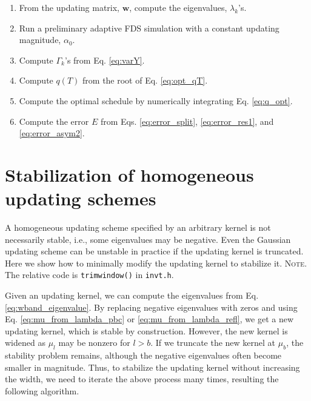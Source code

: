 \documentclass[reprint, floatfix]{revtex4-1}
\newcommand{\note}[1]{{\color{DarkGreen}\footnotesize \textsc{Note.} #1}}
\begin{document}
\begin{enumerate}

\item
From the updating matrix, $\mathbf w$,
compute the eigenvalues, $\lambda_k$'s.

\item
Run a preliminary adaptive FDS simulation
with a constant updating magnitude, $\alpha_0$.

\item
Compute $\Gamma_k$'s from Eq. \eqref{eq:varY}.

\item
Compute $q(T)$ from the root of Eq. \eqref{eq:opt_qT}.

\item
Compute the optimal schedule by
numerically integrating Eq. \eqref{eq:q_opt}.

\item
Compute the error $E$ from
Eqs. \eqref{eq:error_split},
  \eqref{eq:error_res1},
  and
  \eqref{eq:error_asym2}.

\end{enumerate}







\section{\label{sec:stabilize_wband}
Stabilization of homogeneous updating schemes}



%
A homogeneous updating scheme
specified by an arbitrary kernel
is not necessarily stable,
i.e., some eigenvalues may be negative.
%
%
  Even
  the Gaussian updating scheme can be unstable
  in practice
  if the updating kernel is truncated.
%
Here we show how to minimally modify
the updating kernel
to stabilize it.
%
\note{The relative code is \texttt{trimwindow()} in \texttt{invt.h}.
}


Given an updating kernel,
we can compute the eigenvalues from
Eq. \eqref{eq:wband_eigenvalue}.
%
By replacing negative eigenvalues with zeros and
using Eq. \eqref{eq:mu_from_lambda_pbc}
or \eqref{eq:mu_from_lambda_refl},
we get a new updating kernel,
which is stable by construction.
%
However, the new kernel is widened
as $\mu_l$ may be nonzero for $l > b$.
%
If we truncate the new kernel at $\mu_b$,
the stability problem remains,
although the negative eigenvalues
often become smaller in magnitude.
%
Thus, to stabilize the updating kernel
without increasing the width,
we need to iterate the above process many times,
resulting the following algorithm.
\end{document}
